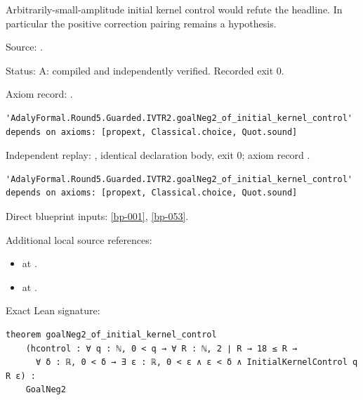 \begin{theorem}[bp-054]
\label{bp-054}
\leanok
Arbitrarily-small-amplitude initial kernel control would refute the headline. In particular the positive correction pairing remains a hypothesis.

\par Source: \texttt{}.
\par Status: A: compiled and independently verified. Recorded exit 0.
\par Axiom record: \texttt{}.
\begin{verbatim}
'AdalyFormal.Round5.Guarded.IVTR2.goalNeg2_of_initial_kernel_control' depends on axioms: [propext, Classical.choice, Quot.sound]
\end{verbatim}
\par Independent replay: \texttt{}, identical declaration body, exit 0; axiom record \texttt{}.
\begin{verbatim}
'AdalyFormal.Round5.Guarded.IVTR2.goalNeg2_of_initial_kernel_control' depends on axioms: [propext, Classical.choice, Quot.sound]
\end{verbatim}
\par Direct blueprint inputs: \ref{bp-001}, \ref{bp-053}.
\par Additional local source references:
\begin{itemize}
\item \texttt{} at \texttt{}.
\item \texttt{} at \texttt{}.
\end{itemize}
\par Exact Lean signature:
\begin{verbatim}
theorem goalNeg2_of_initial_kernel_control
    (hcontrol : ∀ q : ℕ, 0 < q → ∀ R : ℕ, 2 ∣ R → 18 ≤ R →
      ∀ δ : ℝ, 0 < δ → ∃ ε : ℝ, 0 < ε ∧ ε < δ ∧ InitialKernelControl q R ε) :
    GoalNeg2
\end{verbatim}
\end{theorem}

